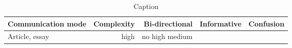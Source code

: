 \begin{table*}\centering
{}
\begin{tabular}{@{}lrrrr@{}}\toprule
Communication mode & Complexity & Bi-directional & Informative  & Confusion
\\\midrule
Article, essay & high & no high
medium
 \\

\bottomrule
\end{tabular}
\caption{Caption}
\end{table*}
